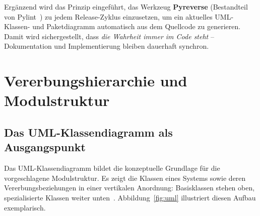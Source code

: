 ﻿\documentclass[a4paper,12pt]{article}
\begin{document}
Ergänzend wird das Prinzip eingeführt, das Werkzeug \textbf{Pyreverse}
(Bestandteil von Pylint~\cite{pylint2024}) zu jedem Release-Zyklus einzusetzen,
um ein aktuelles UML-Klassen- und Paketdiagramm automatisch aus dem Quellcode
zu generieren. Damit wird sichergestellt, dass \textit{die Wahrheit immer im Code
	steht} -- Dokumentation und Implementierung bleiben dauerhaft synchron.

\section{Vererbungshierarchie und Modulstruktur}

\subsection{Das UML-Klassendiagramm als Ausgangspunkt}

Das UML-Klassendiagramm bildet die konzeptuelle Grundlage für die vorgeschlagene
Modulstruktur. Es zeigt die Klassen eines Systems sowie deren Vererbungsbeziehungen
in einer vertikalen Anordnung: Basisklassen stehen oben, spezialisierte Klassen
weiter unten~\cite{omg2017}. Abbildung~\ref{fig:uml} illustriert diesen Aufbau
exemplarisch.
\end{document}

